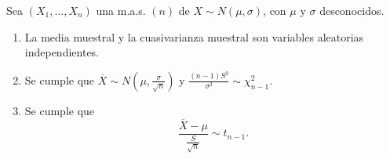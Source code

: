 \begin{theorem}
Sea $\displaystyle \left(X_{1}, \ldots, X_{n}\right) $ una m.a.s. $\displaystyle \left(n\right) $ de $\displaystyle X \sim N\left(\mu, \sigma \right) $, con $\displaystyle \mu $ y $\displaystyle \sigma  $ desconocidos. 
\begin{enumerate}
\item La media muestral y la cuasivarianza muestral son variables aleatorias independientes. 
\item Se cumple que $\displaystyle \overline{X} \sim N\left(\mu, \frac{\sigma }{\sqrt{n}}\right) $ y $\displaystyle \frac{\left(n-1\right)S^{2}}{\sigma^{2}}\sim \chi_{n-1}^{2} $.
\item Se cumple que 
	\[\frac{\overline{X}-\mu}{\frac{S}{\sqrt{n}}}\sim t_{n-1} .\]	
\end{enumerate}
\end{theorem}

